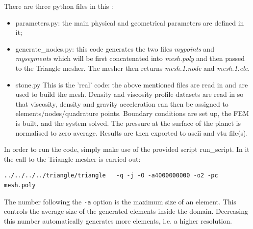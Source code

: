 There are three python files in this \stone:
\begin{itemize}
\item {\pythonfile parameters.py}: the main physical and geometrical parameters are defined in it;
\item {\pythonfile generate\_nodes.py}: this code generates the two files  {\sl mypoints} and {\sl mysegments}
which will be first concatenated into {\sl mesh.poly} and then passed to the Triangle mesher. 
The mesher then returns {\sl mesh.1.node} and {\sl mesh.1.ele}.  
\item {\pythonfile stone.py} This is the 'real' code: the above mentioned files are read in and are used to 
build the mesh. Density and viscosity profile datasets are read in so that viscosity, density and 
gravity acceleration can then be assigned to elements/nodes/quadrature points. Boundary conditions 
are set up, the FEM is built, and the system solved. The pressure at the surface of the planet is 
normalised to zero average. Results are then exported to ascii and vtu file(s).
\end{itemize}
In order to run the code, simply make use of the provided script {\shellscriptfile run\_script}. 
In it the call to the Triangle mesher is carried out:
\begin{verbatim}
../../../../triangle/triangle   -q -j -O -a4000000000 -o2 -pc  mesh.poly
\end{verbatim}
The number following the {\tt -a} option is the maximum size of an element. This controls the 
average size of the generated elements inside the domain. Decreasing this number automatically 
generates more elements, i.e. a higher resolution. 

\begin{center}

\end{center}

